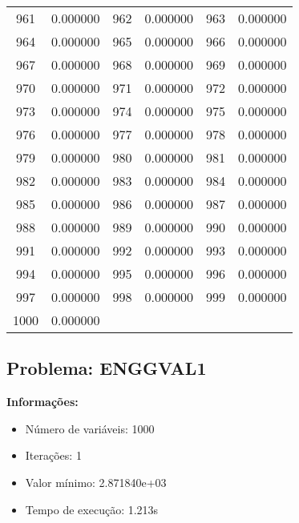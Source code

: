 \documentclass[12pt]{article}
\begin{document}
\begin{longtable}{@{}cc|cc|cc@{}}
961 & 0.000000 & 962 & 0.000000 & 963 & 0.000000 \\
964 & 0.000000 & 965 & 0.000000 & 966 & 0.000000 \\
967 & 0.000000 & 968 & 0.000000 & 969 & 0.000000 \\
970 & 0.000000 & 971 & 0.000000 & 972 & 0.000000 \\
973 & 0.000000 & 974 & 0.000000 & 975 & 0.000000 \\
976 & 0.000000 & 977 & 0.000000 & 978 & 0.000000 \\
979 & 0.000000 & 980 & 0.000000 & 981 & 0.000000 \\
982 & 0.000000 & 983 & 0.000000 & 984 & 0.000000 \\
985 & 0.000000 & 986 & 0.000000 & 987 & 0.000000 \\
988 & 0.000000 & 989 & 0.000000 & 990 & 0.000000 \\
991 & 0.000000 & 992 & 0.000000 & 993 & 0.000000 \\
994 & 0.000000 & 995 & 0.000000 & 996 & 0.000000 \\
997 & 0.000000 & 998 & 0.000000 & 999 & 0.000000 \\
1000 & 0.000000 &  &  &  &  \\

\end{longtable}


\newpage            
\subsection{Problema: ENGGVAL1}

\textbf{Informações:}
\begin{itemize}
\item Número de variáveis: 1000
\item Iterações: 1
\item Valor mínimo: 2.871840e+03
\item Tempo de execução: 1.213s
\end{itemize}
\end{document}
